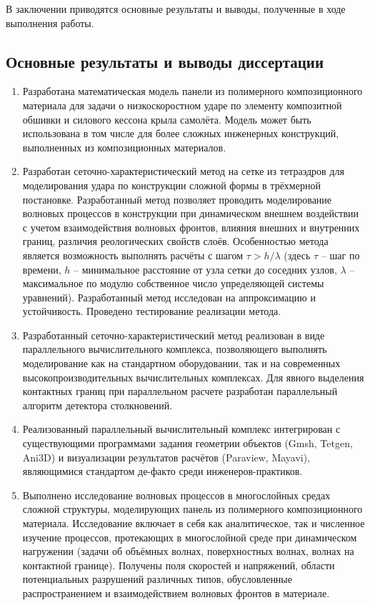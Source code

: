 В заключении приводятся основные результаты и выводы, полученные в ходе выполнения работы.


\subsection*{Основные результаты и выводы диссертации}

\begin{enumerate}

\item Разработана математическая модель панели из полимерного композиционного материала для задачи о низкоскоростном ударе по элементу композитной обшивки и силового кессона крыла самолёта. Модель может быть использована в том числе для более сложных инженерных конструкций, выполненных из композиционных материалов.

\item Разработан сеточно-характеристический метод на сетке из тетраэдров для моделирования удара по конструкции сложной формы в трёхмерной постановке. Разработанный метод позволяет проводить моделирование волновых процессов в конструкции при динамическом внешнем воздействии с учетом взаимодействия волновых фронтов, влияния внешних и внутренних границ, различия реологических свойств слоёв. Особенностью метода является возможность выполнять расчёты с шагом $\tau > h / \lambda$ (здесь $\tau$ -- шаг по времени, $h$ -- минимальное расстояние от узла сетки до соседних узлов, $\lambda$ -- максимальное по модулю собственное число упределяющей системы уравнений). Разработанный метод исследован на аппроксимацию и устойчивость. Проведено тестирование реализации метода.

\item Разработанный сеточно-характеристический метод реализован в виде параллельного вычислительного комплекса, позволяющего выполнять моделирование как на стандартном оборудовании, так и на современных высокопроизводительных вычислительных комплексах. Для явного выделения контактных границ при параллельном расчете разработан параллельный алгоритм детектора столкновений.

\item Реализованный параллельный вычислительный комплекс интегрирован с существующими программами задания геометрии объектов (Gmsh, Tetgen, Ani3D) и визуализации результатов расчётов (Paraview, Mayavi), являющимися стандартом де-факто среди инженеров-практиков.

\item Выполнено исследование волновых процессов в многослойных средах сложной структуры, моделирующих панель из полимерного композиционного материала. Исследование включает в себя как аналитическое, так и численное изучение процессов, протекающих в многослойной среде при динамическом нагружении (задачи об объёмных волнах, поверхностных волнах, волнах на контактной границе). Получены поля скоростей и напряжений, области потенциальных разрушений различных типов, обусловленные распространением и взаимодействием волновых фронтов в материале.


\end{enumerate}
